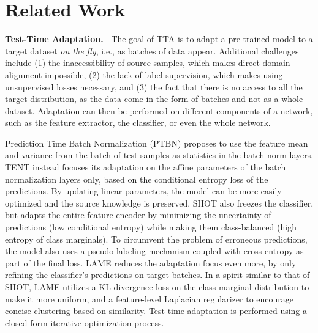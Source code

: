 \documentclass{article}
\newcommand{\mypar}[1]{\vspace{3pt}\noindent\textbf{#1~}}
\begin{document}
\section{Related Work}
\label{sec:previous}

\mypar{Test-Time Adaptation.} The goal of TTA is to adapt a pre-trained model to a target dataset \emph{on the fly}, i.e., as batches of data appear. Additional challenges include (1) the inaccessibility of source samples, which makes direct domain alignment impossible, (2) the lack of label supervision, which makes using unsupervised losses necessary, and (3) the fact that there is no access to all the target distribution, as the data come in the form of batches and not as a whole dataset. Adaptation can then be performed on different components of a network, such as the feature extractor, the classifier, or even the whole network. 

Prediction Time Batch Normalization (PTBN) \cite{PTBN} proposes to use the feature mean and variance from the batch of test samples as statistics in the batch norm layers. TENT \cite{tent2021} instead focuses its adaptation on the affine parameters of the batch normalization layers only, based on the conditional entropy loss of the predictions. By updating linear parameters, the model can be more easily optimized and the source knowledge is preserved. SHOT \cite{shot2021} also freezes the classifier, but adapts the entire feature encoder by minimizing the uncertainty of predictions (low conditional entropy) while making them class-balanced (high entropy of class marginals). To circumvent the problem of erroneous predictions, the model also uses a pseudo-labeling mechanism coupled with cross-entropy as part of the final loss. LAME \cite{lame2022} reduces the adaptation focus even more, by only refining the classifier's predictions on target batches. In a spirit similar to that of SHOT, LAME utilizes a KL divergence loss on the class marginal distribution to make it more uniform, and a feature-level Laplacian regularizer to encourage concise clustering based on similarity. Test-time adaptation is performed using a closed-form iterative optimization process. 
\end{document}
